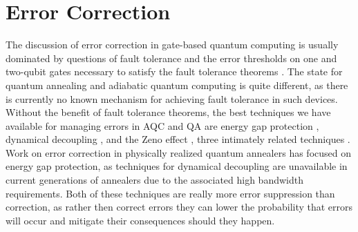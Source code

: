 \section{Error Correction}
\label{sec:err-corr}
The discussion of error correction in gate-based quantum computing is usually dominated by questions of fault tolerance and the error thresholds on one and two-qubit gates necessary to satisfy the fault tolerance theorems \cite{Aliferis:05,Raussendorf28092012,Lidar-Brun:book}. The state for quantum annealing and adiabatic quantum computing is quite different, as there is currently no known mechanism for achieving fault tolerance in such devices. Without the benefit of fault tolerance theorems, the best techniques we have available for managing errors in AQC and QA are energy gap protection \cite{jordan2006error}, dynamical decoupling \cite{PhysRevLett.100.160506}, and the Zeno effect \cite{PhysRevLett.108.080501}, three intimately related techniques \cite{Young:13}. Work on error correction in physically realized quantum annealers has focused on energy gap protection, as techniques for dynamical decoupling are unavailable in current generations of annealers due to the associated high bandwidth requirements. Both of these techniques are really more error suppression than correction, as rather then correct errors  they can lower the probability that errors will occur and mitigate their consequences should they happen.

